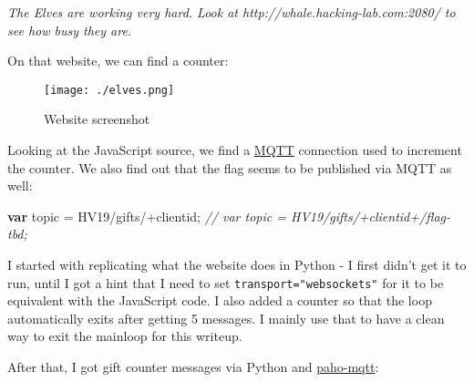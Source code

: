 \documentclass[11pt]{article}
\newenvironment{Shaded}{}{}
\newcommand{\KeywordTok}[1]{\textcolor[rgb]{0.00,0.44,0.13}{\textbf{{#1}}}}
\newcommand{\StringTok}[1]{\textcolor[rgb]{0.25,0.44,0.63}{{#1}}}
\newcommand{\CommentTok}[1]{\textcolor[rgb]{0.38,0.63,0.69}{\textit{{#1}}}}
\newcommand{\NormalTok}[1]{{#1}}
\newcommand{\OperatorTok}[1]{\textcolor[rgb]{0.40,0.40,0.40}{{#1}}}
\begin{document}
\emph{The Elves are working very hard. Look at
http://whale.hacking-lab.com:2080/ to see how busy they are.}

On that website, we can find a counter:

\begin{figure}
\centering
\texttt{[image: ./elves.png]}
\caption{Website screenshot}
\end{figure}

Looking at the JavaScript source, we find a
\href{https://en.wikipedia.org/wiki/MQTT}{MQTT} connection used to
increment the counter. We also find out that the flag seems to be
published via MQTT as well:

\begin{Shaded}
\begin{Highlighting}[]
\KeywordTok{var}\NormalTok{ topic }\OperatorTok{=} \StringTok{\textquotesingle{}HV19/gifts/\textquotesingle{}}\OperatorTok{+}\NormalTok{clientid}\OperatorTok{;}
\CommentTok{// var topic = \textquotesingle{}HV19/gifts/\textquotesingle{}+clientid+\textquotesingle{}/flag{-}tbd\textquotesingle{};}
\end{Highlighting}
\end{Shaded}

I started with replicating what the website does in Python - I first
didn't get it to run, until I got a hint that I need to set
\texttt{transport="websockets"} for it to be equivalent with the
JavaScript code. I also added a counter so that the loop automatically
exits after getting 5 messages. I mainly use that to have a clean way to
exit the mainloop for this writeup.

After that, I got gift counter messages via Python and
\href{https://pypi.org/project/paho-mqtt/}{paho-mqtt}:
\end{document}
